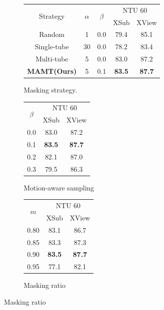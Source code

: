\begin{figure}[tb]
    \centering
    \begin{subfigure}[t]{0.5\linewidth}
        \centering
        \begin{tabular}{c c c c c}
            \toprule
            \multirow{2}{*}{Strategy} & \multirow{2}{*}{$\alpha$} & \multirow{2}{*}{$\beta$} & \multicolumn{2}{c}{NTU 60} \\
            & & & XSub & XView \\
            \midrule
            Random & 1 & 0.0 & 79.4 & 85.1 \\
            Single-tube & 30 & 0.0 & 78.2 & 83.4 \\
            Multi-tube & 5 & 0.0 & 83.0 & 87.2 \\
            \textbf{MAMT(Ours)} & 5 & 0.1 & \textbf{83.5} & \textbf{87.7} \\
            \bottomrule
        \end{tabular}
        \caption{Masking strategy.}
        \label{tab:masking_strategy}
    \end{subfigure}
    \hfill
    \begin{subfigure}[t]{0.24\linewidth}
        \centering
        \begin{tabular}{c c c}
            \toprule
            \multirow{2}{*}{$\beta$} & \multicolumn{2}{c}{NTU 60} \\
            & XSub & XView \\
            \midrule
            0.0 & 83.0 & 87.2 \\
            0.1 & \textbf{83.5} & \textbf{87.7} \\
            0.2 & 82.1 & 87.0 \\
            0.3 & 79.5 & 86.3 \\
            \bottomrule
        \end{tabular}
        \caption{Motion-aware sampling}
        \label{tab:beta}
    \end{subfigure}
    \hfill
    \begin{subfigure}[t]{0.24\linewidth}
        \centering
        \begin{tabular}{c c c}
            \toprule
            \multirow{2}{*}{$m$} & \multicolumn{2}{c}{NTU 60} \\
            & XSub & XView \\
            \midrule
            0.80 & 83.1 & 86.7 \\
            0.85 & 83.3 & 87.3 \\
            0.90 & \textbf{83.5} & \textbf{87.7} \\
            0.95 & 77.1 & 82.1 \\
            \bottomrule
        \end{tabular}
        \caption{Masking ratio}
        \label{tab:masking_ratio}
    \end{subfigure}
    \label{tab:masking_ratio_and_beta}
\end{figure}

